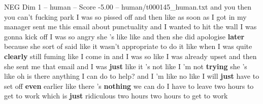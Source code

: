 \begin{textsample}{NEG Dim 1 – human – Score -5.00 – human/t000145\_human.txt}  \label{ex:f1_neg_037}
and you then you can't fucking park I was so pissed off and then like as soon as I got in my manager sent me this email about punctuality and I wanted to hit the wall I was gonna kick off I was so angry she 's like like and then she did apologise \textbf{later} because she sort of said like it wasn't appropriate to do it like when I was quite \textbf{clearly} still fuming like I come in and I was so like I was already upset and then she sent me that email and I was \textbf{just} like it 's not like I 'm not \textbf{trying} she 's like oh is there anything I can do to help? and I 'm like no like I will \textbf{just} have to set off \textbf{even} earlier like there 's \textbf{nothing} we can do I have to leave two hours to get to work which is \textbf{just} ridiculous two hours two hours to get to work

\end{textsample}
